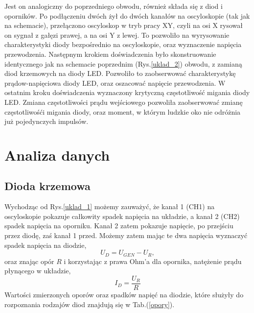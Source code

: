 \documentclass[10pt,a4paper]{article}
\begin{document}
Jest on analogiczny do poprzedniego obwodu, również składa się z diod i oporników. Po podłączeniu dwóch żył do dwóch kanałów na oscyloskopie (tak jak na schemacie), przełączono oscyloskop w tryb pracy XY, czyli na osi X rysował on sygnał z gałęzi prawej, a na osi Y z lewej. To pozwoliło na wyrysowanie charakterystyki diody bezpośrednio na oscyloskopie, oraz wyznaczenie napięcia przewodzenia.
Następnym krokiem doświadczenia było skonstruowanie identycznego jak na schemacie poprzednim (Rys.\ref{uklad_2}) obwodu, z zamianą diod krzemowych na diody LED. Pozwoliło to zaobserwować charakterystykę prądow-napięciowa diody LED, oraz oszacować napięcie przewodzenia.
W ostatnim kroku doświadczenia wyznaczony krytyczną częstotliwość migania diody LED. Zmiana częstotliwości prądu wejściowego pozwoliła zaobserwować zmianę częstotliwośći migania diody, oraz moment, w którym ludzkie oko nie odróżnia już pojedynczych impulsów.

\section*{Analiza danych}
\subsection*{Dioda krzemowa}
Wychodząc od Rys.\ref{uklad_1} możemy zauważyć, że kanał 1 (CH1) na oscyloskopie pokazuje całkowity spadek napięcia na układzie, a kanał 2 (CH2) spadek napięcia na oporniku. Kanał 2 zatem pokazuje napięcie, po przejściu przez diodę, zaś kanał 1 przed. Możemy zatem mając te dwa napięcia wyznaczyć spadek napięcia na diodzie, 
\begin{equation}
U_D = U_{GEN} - U_R,
\end{equation} 
oraz znając opór $R$ i korzystając z prawa Ohm'a dla opornika, natężenie prądu płynącego w układzie,
\begin{equation}
I_D = \frac{U_R}{R}
\end{equation}
Wartości zmierzonych oporów oraz spadków napięć na diodzie, które służyły do rozpoznania rodzajów diod znajdują się w Tab.(\ref{opory}).
\end{document}
